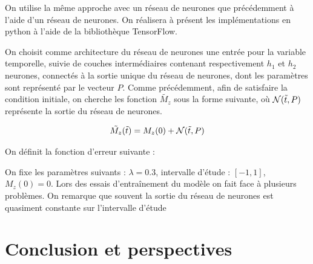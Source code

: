 \documentclass[12pt]{report}
\begin{document}
On utilise la même approche avec un réseau de neurones que précédemment à l'aide d'un réseau de neurones.
On réalisera à présent les implémentations en python à l'aide de la bibliothèque TensorFlow.


On choisit comme architecture du réseau de neurones une entrée pour la variable temporelle, 
suivie de couches intermédiaires contenant respectivement $h_1$ et $h_2$ neurones, connectés
à la sortie unique du réseau de neurones, dont les paramètres sont représenté par le vecteur $P$.
Comme précédemment, afin de satisfaire la condition initiale, on cherche les fonction $\tilde{M_z}$
sous la forme suivante, où ${\mathcal{N}}(\Tilde{t},P)$ représente la sortie du réseau de neurones.

\begin{equation}
    \Tilde{M_z}(\Tilde{t}) = M_z(0) + {\mathcal{N}}(\Tilde{t},P) 
    \label{eq:solution NN Mz}
\end{equation}

On définit la fonction d'erreur suivante :


On fixe les paramètres suivants : $\lambda = 0.3$, intervalle d'étude : $[-1,1]$, $M_z(0) = 0$.
Lors des essais d'entraînement du modèle on fait face à plusieurs problèmes.
On remarque que souvent la sortie du réseau de neurones est quasiment constante
sur l'intervalle d'étude

\chapter{Conclusion et perspectives}
\label{Conclusion}

\begin{thebibliography}{2}
\end{thebibliography}
\end{document}
